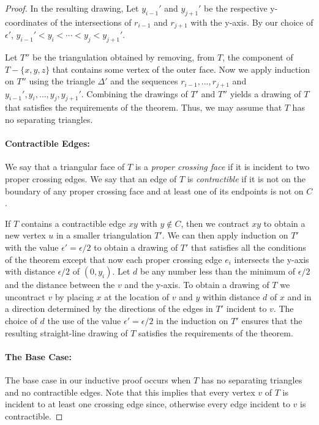 \documentclass{patmorin}
\begin{document}
\begin{proof}
   In the resulting drawing, Let $y_{i-1}'$ and $y_{j+1}'$ be
   the respective y-coordinates of the intersections of $r_{i-1}$
   and $r_{j+1}$ with the y-axis.  By our choice of $\epsilon'$,
   $y_{i-1}'<y_i<\cdots<y_j<y_{j+1}'$.

   Let $T''$ be the triangulation obtained by removing, from $T$, the
   component of $T-\{x,y,z\}$ that contains some vertex of the outer face.  Now we
   apply induction on $T''$ using the triangle $\Delta'$ and the sequences
   $r_{i-1},\ldots,r_{j+1}$ and $y_{i-1}',y_i,\ldots,y_{j},y_{j+1}'$.
   Combining the drawings of $T'$ and $T''$ yields a drawing of $T$
   that satisfies the requirements of the theorem.  Thus, we may assume
   that $T$ has no separating triangles.

   \paragraph{Contractible Edges:}
   We say that a triangular face of $T$ is a \emph{proper crossing face}
   if it is incident to two proper crossing edges.  We say that an edge
   of $T$ is \emph{contractible} if it is not on the boundary of any
   proper crossing face and at least one of its endpoints is not on $C$.

   If $T$ contains a contractible edge $xy$ with $y\not\in C$,
   then we contract $xy$ to obtain a new vertex $u$ in a smaller
   triangulation $T'$.   We can then apply induction on $T'$ with
   the value $\epsilon'=\epsilon/2$ to obtain a drawing of $T'$ that
   satisfies all the conditions of the theorem except that now each proper
   crossing edge $e_i$ intersects the y-axis with distance $\epsilon/2$ of
   $(0,y_i)$.  Let $d$ be any number less than the minimum of $\epsilon/2$
   and the distance between the $v$ and the y-axis.  To obtain a drawing
   of $T$ we uncontract $v$ by placing $x$ at the location of $v$ and
   $y$ within distance $d$ of $x$ and in a direction determined by the
   directions of the edges in $T'$ incident to $v$.  The choice of $d$
   the use of the value $\epsilon'=\epsilon/2$ in the induction on $T'$
   ensures that the resulting straight-line drawing of $T$ satisfies
   the requirements of the theorem.

   \paragraph{The Base Case:}
   The base case in our inductive proof occurs when $T$ has no separating
   triangles and no contractible edges.  Note that this implies that
   every vertex $v$ of $T$ is incident to at least one crossing edge
   since, otherwise every edge incident to $v$ is contractible.
  

\end{proof}
\end{document}

